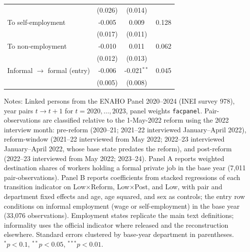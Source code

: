 \begin{table}[!tbp]
\begin{threeparttable}
\begin{tabular}{lccc}
 & (0.026) & (0.014) & \\
To self-employment & -0.005 & 0.009 & 0.128 \\
 & (0.017) & (0.011) & \\
To non-employment & -0.010 & 0.011 & 0.062 \\
 & (0.012) & (0.013) & \\
Informal $\to$ formal (entry) & -0.006 & -0.021$^{**}$ & 0.045 \\
 & (0.005) & (0.008) & \\
\bottomrule
\end{tabular}
\begin{tablenotes}\footnotesize
\item Notes: Linked persons from the ENAHO Panel 2020--2024 (INEI survey 978), year pairs $t\to t{+}1$ for $t=2020,\dots,2023$, panel weights \texttt{facpanel}. Pair-observations are classified relative to the 1-May-2022 reform using the 2022 interview month: pre-reform (2020--21; 2021--22 interviewed January--April 2022), reform-window (2021--22 interviewed from May 2022; 2022--23 interviewed January--April 2022, whose base state predates the reform), and post-reform (2022--23 interviewed from May 2022; 2023--24). Panel A reports weighted destination shares of workers holding a formal private job in the base year (7,011 pair-observations). Panel B reports coefficients from stacked regressions of each transition indicator on Low$\times$Reform, Low$\times$Post, and Low, with pair and department fixed effects and age, age squared, and sex as controls; the entry row conditions on informal employment (wage or self-employment) in the base year (33,076 observations). Employment states replicate the main text definitions; informality uses the official indicator where released and the reconstruction elsewhere. Standard errors clustered by base-year department in parentheses. $^{*}p<0.1$, $^{**}p<0.05$, $^{***}p<0.01$.
\end{tablenotes}
\end{threeparttable}\end{table}

